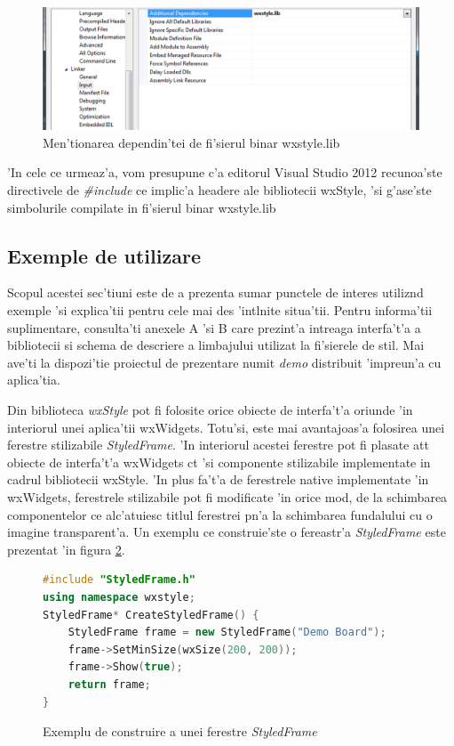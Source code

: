 \begin{figure}[H]
\includegraphics[width=15cm]{img/ch7_ide_lib_file.png}
\caption{Men'tionarea dependin'tei de fi'sierul binar wxstyle.lib}
\label{ch7_ide_lib_file}
\end{figure}

'In cele ce urmeaz'a, vom presupune c'a editorul Visual Studio 2012 recunoa'ste directivele de \emph{\#include} ce implic'a headere ale bibliotecii wxStyle, 'si g'ase'ste simbolurile compilate in fi'sierul binar wxstyle.lib

\subsection{Exemple de utilizare}

Scopul acestei sec'tiuni este de a prezenta sumar punctele de interes utiliz{\ia}nd exemple 'si explica'tii pentru cele mai des 'int{\ia}lnite situa'tii. Pentru informa'tii suplimentare, consulta'ti anexele A 'si B care prezint'a intreaga interfa't'a a bibliotecii si schema de descriere a limbajului utilizat la fi'sierele de stil. Mai ave'ti la dispozi'tie proiectul de prezentare numit \emph{demo} distribuit 'impreun'a cu aplica'tia.

\medskip

Din biblioteca \emph{wxStyle} pot fi folosite orice obiecte de interfa't'a oriunde 'in interiorul unei aplica'tii wxWidgets. Totu'si, este mai avantajoas'a folosirea unei ferestre stilizabile \emph{StyledFrame}. 'In interiorul acestei ferestre pot fi plasate at{\ia}t obiecte de interfa't'a wxWidgets c{\ia}t 'si componente stilizabile implementate in cadrul bibliotecii wxStyle. 'In plus fa't'a de ferestrele native implementate 'in wxWidgets, ferestrele stilizabile pot fi modificate 'in orice mod, de la schimbarea componentelor ce alc'atuiesc titlul ferestrei p{\ia}n'a la schimbarea fundalului cu o imagine transparent'a. Un exemplu ce construie'ste o fereastr'a \emph{StyledFrame} este prezentat 'in figura \ref{ex01}.

\begin{figure}[H]
\begin{lstlisting}[language=C++]
#include "StyledFrame.h"
using namespace wxstyle;
StyledFrame* CreateStyledFrame() {
	StyledFrame frame = new StyledFrame("Demo Board");
	frame->SetMinSize(wxSize(200, 200));
	frame->Show(true);
	return frame;
}
\end{lstlisting}
\caption{Exemplu de construire a unei ferestre \emph{StyledFrame}}
\label{ex01}
\end{figure}

